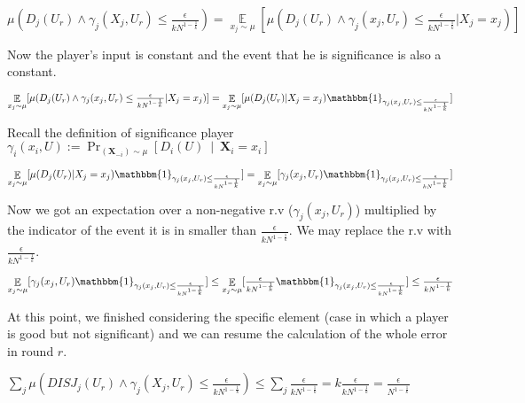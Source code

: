 \documentclass{article}
\newcommand{\coloneq}{:=}
\newcommand{\given}{\medspace \middle| \medspace}
\newcommand{\rv}[1]{\mathbf{#1}}
\theoremstyle{plain}
\begin{document}
$\mu(D_j(U_r) \land \gamma_j(X_j, U_r) \leq \frac{\epsilon}{kN^{1-\frac{1}{k}}}) = \underset{x_j \sim \mu}{\mathop{\mathbb{E}}}[\mu(D_j(U_r) \land \gamma_j(x_j, U_r) \leq \frac{\epsilon}{kN^{1-\frac{1}{k}}} | X_j = x_j)]$ \newline

Now the player's input is constant and the event that he is significance is also a constant. \newline

$\underset{x_j \sim \mu}{\mathop{\mathbb{E}}}[\mu(D_j(U_r) \land \gamma_j(x_j, U_r) \leq \frac{\epsilon}{kN^{1-\frac{1}{k}}} | X_j = x_j)] = \underset{x_j \sim \mu}{\mathop{\mathbb{E}}}[\mu(D_j(U_r) | X_j = x_j) \mathbbm{1}_{\gamma_j(x_j, U_r) \leq \frac{\epsilon}{kN^{1-\frac{1}{k}}}}]$ \newline

Recall the definition of significance player $\gamma_i(x_i, U) \coloneq \Pr_{(\rv{X}_{-i}) \sim \mu}\left[D_i (U) \given \rv{X}_i = x_i \right]$ \newline

$\underset{x_j \sim \mu}{\mathop{\mathbb{E}}}[\mu(D_j(U_r) | X_j = x_j) \mathbbm{1}_{\gamma_j(x_j, U_r) \leq \frac{\epsilon}{kN^{1-\frac{1}{k}}}}] = \underset{x_j \sim \mu}{\mathop{\mathbb{E}}}[\gamma_j(x_j, U_r) \mathbbm{1}_{\gamma_j(x_j, U_r) \leq \frac{\epsilon}{kN^{1-\frac{1}{k}}}}]$ \newline

Now we got an expectation over a non-negative r.v ($\gamma_j(x_j, U_r)$) multiplied by the indicator of the event it is in smaller than $\frac{\epsilon}{kN^{1-\frac{1}{k}}}$. We may replace the r.v with $\frac{\epsilon}{kN^{1-\frac{1}{k}}}$. \newline

$\underset{x_j \sim \mu}{\mathop{\mathbb{E}}}[\gamma_j(x_j, U_r) \mathbbm{1}_{\gamma_j(x_j, U_r) \leq \frac{\epsilon}{kN^{1-\frac{1}{k}}}}] \leq \underset{x_j \sim \mu}{\mathop{\mathbb{E}}}[\frac{\epsilon}{kN^{1-\frac{1}{k}}} \mathbbm{1}_{\gamma_j(x_j, U_r) \leq \frac{\epsilon}{kN^{1-\frac{1}{k}}}}] \leq \frac{\epsilon}{kN^{1-\frac{1}{k}}}$ \newline

At this point, we finished considering the specific element (case in which a player is good but not significant) and we can resume the calculation of the whole error in round $r$.  \newline

$\sum_j \mu(DISJ_j(U_r) \land \gamma_j(X_j, U_r) \leq \frac{\epsilon}{kN^{1-\frac{1}{k}}}) \leq \sum_j \frac{\epsilon}{kN^{1-\frac{1}{k}}} = k\frac{\epsilon}{kN^{1-\frac{1}{k}}} = \frac{\epsilon}{N^{1-\frac{1}{k}}}$
\newline
\end{document}
